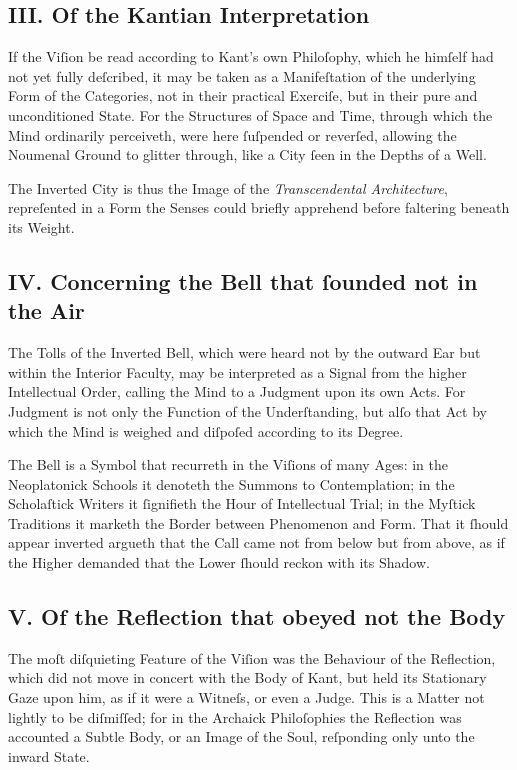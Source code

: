 \documentclass[12pt]{article}
\begin{document}
\subsection*{III. Of the Kantian Interpretation}
If the Viſion be read according to Kant’s own Philoſophy, which he himſelf 
had not yet fully deſcribed, it may be taken as a Manifeſtation of the 
underlying Form of the Categories, not in their practical Exerciſe, but in 
their pure and unconditioned State. For the Structures of Space and Time, 
through which the Mind ordinarily perceiveth, were here ſuſpended or 
reverſed, allowing the Noumenal Ground to glitter through, like a City 
ſeen in the Depths of a Well.

The Inverted City is thus the Image of the \textit{Transcendental Archi­tecture}, 
repreſented in a Form the Senses could briefly apprehend before faltering 
beneath its Weight.

\subsection*{IV. Concerning the Bell that ſounded not in the Air}
The Tolls of the Inverted Bell, which were heard not by the outward Ear but 
within the Interior Faculty, may be interpreted as a Signal from the higher 
Intellectual Order, calling the Mind to a Judgment upon its own Acts. For 
Judgment is not only the Function of the Underſtanding, but alſo that Act by 
which the Mind is weighed and diſpoſed according to its Degree.

The Bell is a Symbol that recurreth in the Viſions of many Ages: in the 
Neoplatonick Schools it denoteth the Summons to Contemplation; in the 
Scholaſtick Writers it ſignifieth the Hour of Intellectual Trial; in the 
Myſtick Traditions it marketh the Border between Phenomenon and Form. That 
it ſhould appear inverted argueth that the Call came not from below but from 
above, as if the Higher demanded that the Lower ſhould reckon with its 
Shadow.

\subsection*{V. Of the Reflection that obeyed not the Body}
The moſt diſquieting Feature of the Viſion was the Behaviour of the 
Reflection, which did not move in concert with the Body of Kant, but held 
its Sta­tionary Gaze upon him, as if it were a Witneſs, or even a Judge. 
This is a Matter not lightly to be diſmiſſed; for in the Archaick 
Philoſophies the Reflection was accounted a Subtle Body, or an Image of the 
Soul, reſponding only unto the inward State.
\end{document}
